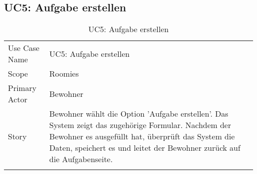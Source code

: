 \subsection{UC5: Aufgabe erstellen}
\begin{table}[H]
	\tablestyle
	\tablealtcolored
	\begin{tabularx}{\textwidth}{lX}
		\tablebody
			Use Case Name &
			UC5: Aufgabe erstellen
			\tabularnewline
			Scope &
			Roomies
			\tabularnewline
			Primary Actor &
			Bewohner
			\tabularnewline
			Story &
			Bewohner wählt die Option 'Aufgabe erstellen'. Das System zeigt das zugehörige Formular. Nachdem der Bewohner es ausgefüllt hat, überprüft das System die Daten, speichert es und leitet der Bewohner zurück auf die Aufgabenseite.
			\tabularnewline
		\tableend
	\end{tabularx}
	\caption{UC5: Aufgabe erstellen}
\end{table}


